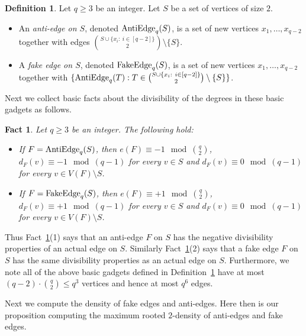 \documentclass[11pt]{article}
\numberwithin{equation}{section}
\newcounter{i}
\theoremstyle{plain}
\newtheorem{fact}[thm]{Fact}
\theoremstyle{plain} %
\theoremstyle{definition}
\newtheorem{definition}[thm]{Definition}
\begin{document}
\begin{definition}\label{def:BasicGadget}
Let $q\ge 3$ be an integer. Let $S$ be a set of vertices of size $2$.
\begin{itemize}
    \item An \emph{anti-edge on $S$}, denoted ${\rm AntiEdge}_q(S)$, is a set of new vertices $x_1,\ldots, x_{q-2}$ together with edges $\binom{S\cup \{x_i:~i\in[q-2]\} }{2} \setminus \{S\}$.
    \item A \emph{fake edge on $S$}, denoted ${\rm FakeEdge}_q(S)$, is a set of new vertices $x_1,\ldots, x_{q-2}$ together with  $\{ {\rm AntiEdge}_q(T): T\in \binom{S\cup \{x_i:~i\in[q-2]\} }{2} \setminus \{S\} \}$.
\end{itemize}    

\end{definition}

Next we collect basic facts about the divisibility of the degrees in these basic gadgets as follows.



\begin{fact}\label{fact:Div}
Let $q\ge 3$ be an integer. The following hold:
\begin{itemize}
    \item[(1)] If $F={\rm AntiEdge}_q(S)$, then $e(F) \equiv -1 \mod \binom{q}{2}$, $d_F(v)\equiv -1 \mod (q-1)$ for every $v\in S$ and $d_F(v)\equiv 0 \mod (q-1)$ for every $v\in V(F)\setminus S$.
    \item[(2)] If $F={\rm FakeEdge}_q(S)$, then $e(F) \equiv +1 \mod \binom{q}{2}$, $d_F(v)\equiv +1 \mod (q-1)$ for every $v\in S$ and $d_F(v)\equiv 0 \mod (q-1)$ for every $v\in V(F)\setminus S$.
\end{itemize}
\end{fact}

Thus Fact~\ref{fact:Div}(1) says that an anti-edge $F$ on $S$ has the negative divisibility properties of an actual edge on $S$. Similarly Fact~\ref{fact:Div}(2) says that a fake edge $F$ on $S$ has the same divisibility properties as an actual edge on $S$.  Furthermore, we note all of the above basic gadgets defined in Definition~\ref{def:BasicGadget} have at most $(q-2)\cdot \binom{q}{2} \le q^{3}$ vertices and hence at most $q^{6}$ edges.

Next we compute the density of fake edges and anti-edges.
Here then is our proposition computing the maximum rooted $2$-density of anti-edges and fake edges.
\end{document}
